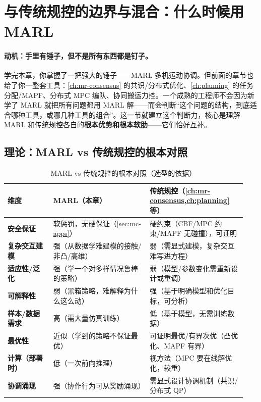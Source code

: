 \section{与传统规控的边界与混合：什么时候用 MARL}
\label{sec:mc-boundary}

\paragraph{动机：手里有锤子，但不是所有东西都是钉子。}
学完本章，你掌握了一把强大的锤子——MARL 多机运动协调。但前面的章节也给了你一整套工具：\cref{ch:mr-consensus} 的共识/分布式优化、\cref{ch:planning} 的任务分配/MAPF、分布式 MPC 编队、协同搬运力控。一个成熟的工程师不会因为新学了 MARL 就把所有问题都用 MARL 解——而会判断“这个问题的结构，到底适合哪种工具，或哪几种工具的组合”。这一节就建立这个判断力，核心是理解 MARL 和传统规控各自的\textbf{根本优势和根本软肋}——它们恰好互补。

\subsection{理论：MARL vs 传统规控的根本对照}
\label{sec:mc-vs-classical}

\begin{table}[H]\centering\small
\caption{MARL vs 传统规控的根本对照（选型的依据）}
\label{tab:mc-vs-classical}
\begin{tabular}{p{0.18\linewidth}p{0.38\linewidth}p{0.38\linewidth}}
\toprule
维度 & MARL（本章） & 传统规控（\cref{ch:mr-consensus,ch:planning} 等） \\
\midrule
\textbf{安全保证} & 软惩罚，无硬保证（\cref{sec:mc-apps}） & 硬约束（CBF/MPC 约束/MAPF 无碰撞），可证明 \\
\textbf{复杂交互建模} & 强（从数据学难建模的接触/非凸/高维） & 弱（需显式建模，复杂交互难写进方程） \\
\textbf{适应性/泛化} & 强（学一个对多样情况鲁棒的策略） & 弱（模型/参数变化需重新设计或重调） \\
\textbf{可解释性} & 弱（黑箱策略，难解释为什么这么动） & 强（基于明确模型和优化目标，可分析） \\
\textbf{样本/数据需求} & 高（需大量仿真训练） & 低（基于模型，无需训练数据） \\
\textbf{最优性} & 近似（学到的策略不保证最优） & 可证明最优/有界次优（凸优化、MAPF 有界） \\
\textbf{计算（部署时）} & 低（一次前向推理） & 视方法（MPC 要在线解优化，较重） \\
\textbf{协调涌现} & 强（协作行为可从奖励涌现） & 需显式设计协调机制（共识/分布式 QP） \\
\bottomrule
\end{tabular}
\end{table}

